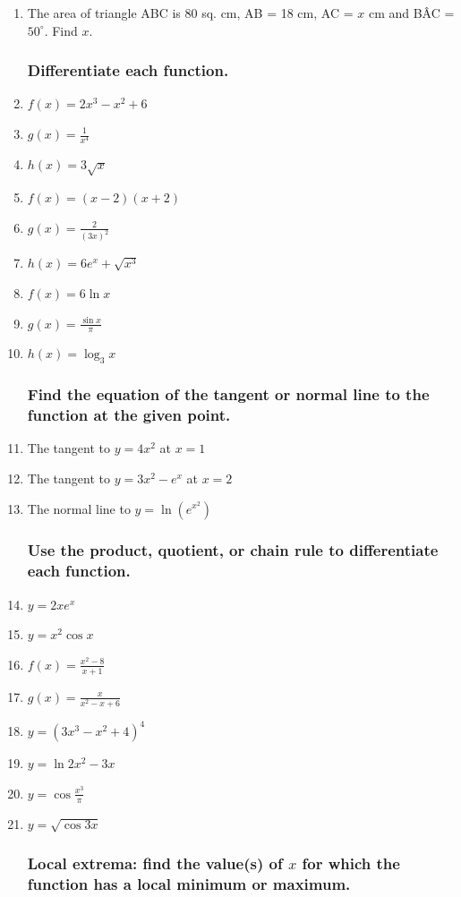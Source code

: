 \documentclass[12pt, oneside]{article}
\begin{document}
\begin{enumerate}
\item The area of triangle ABC is 80 sq. cm, AB = 18 cm, AC = $x$ cm and B\^AC = $50^\circ$. Find $x$.


\subsubsection*{Differentiate each function.}

\item $f(x)=2x^3-x^2+6$
\item $g(x) = \frac{1}{x^4}$
\item $h(x)= 3\sqrt{x}$
\item $f(x)=(x-2)(x+2)$
\item $g(x)=\frac{2}{(3x)^2}$
\item $h(x)=6e^x+\sqrt{x^3}$
\item $f(x)=6\ln{x}$
\item $g(x) = \displaystyle \frac{\sin x}{\pi}$
\item $h(x)= \log_3{x}$

\subsubsection*{Find the equation of the tangent or normal line to the function at the given point.}

\item The tangent to $y=4x^2$ at $x=1$
\item The tangent to $y=3x^2-e^x$ at $x=2$
\item The normal line to $\displaystyle y=\ln(e^{x^2})$

\subsubsection*{Use the product, quotient, or chain rule to differentiate each function.}

\item $y=2xe^x$
\item $y= x^2\cos{x}$
\item $f(x)= \displaystyle \frac{x^2-8}{x+1}$
\item $g(x) =\displaystyle \frac{x}{x^2-x+6}$
\item $y = (3x^3-x^2+4)^4$
\item $y= \ln{2x^2-3x}$
\item $y= \displaystyle \cos{\frac{x^3}{\pi}}$
\item $y = \sqrt{\cos{3x}}$

\subsubsection*{Local extrema: find the value(s) of $x$ for which the function has a local minimum or maximum.}


\end{enumerate}
\end{document}
